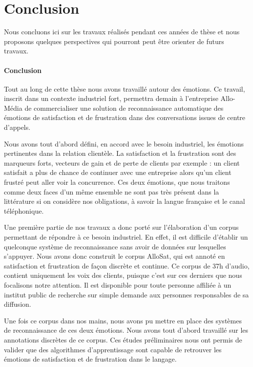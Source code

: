 \chapter*{Conclusion}

Nous concluons ici sur les travaux réalisés pendant ces années de thèse et nous proposons quelques perspectives qui pourront peut être orienter de futurs travaux.

\subsubsection{Conclusion}
Tout au long de cette thèse nous avons travaillé autour des émotions. Ce travail, inscrit dans un contexte industriel fort, permettra demain à l'entreprise Allo-Média de commercialiser une solution de reconnaissance automatique des émotions de satisfaction et de frustration dans des conversations issues de centre d'appels.

Nous avons tout d'abord défini, en accord avec le besoin industriel, les émotions pertinentes dans la relation clientèle. La satisfaction et la frustration sont des marqueurs forts, vecteurs de gain et de perte de clients par exemple : un client satisfait a plus de chance de continuer avec une entreprise alors qu'un client frustré peut aller voir la concurrence. Ces deux émotions, que nous traitons comme deux faces d'un même ensemble ne sont pas très présent dans la littérature si on considère nos obligations, à savoir la langue française et le canal téléphonique.

Une première partie de nos travaux a donc porté sur l'élaboration d'un corpus permettant de répondre à ce besoin industriel. En effet, il est difficile d'établir un quelconque système de reconnaissance sans avoir de données sur lesquelles s'appuyer. Nous avons donc construit le corpus AlloSat, qui est annoté en satisfaction et frustration de façon discrète et continue. Ce corpus de 37h d'audio, contient uniquement les voix des clients, puisque c'est sur ces derniers que nous focalisons notre attention. Il est disponible pour toute personne affiliée à un institut public de recherche sur simple demande aux personnes responsables de sa diffusion.

Une fois ce corpus dans nos mains, nous avons pu mettre en place des systèmes de reconnaissance de ces deux émotions. Nous avons tout d'abord travaillé sur les annotations discrètes de ce corpus. Ces études préliminaires nous ont permis de valider que des algorithmes d'apprentissage sont capable de retrouver les émotions de satisfaction et de frustration dans le langage.


